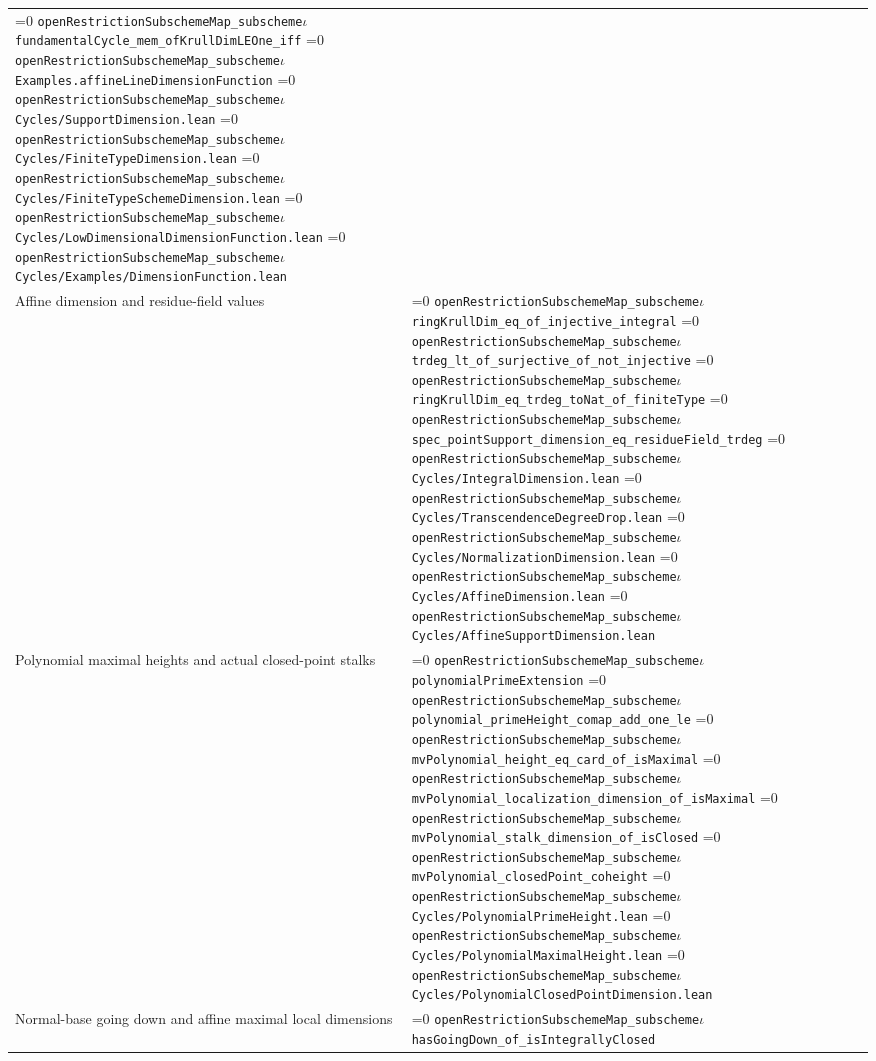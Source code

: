 \documentclass[11pt]{article}
\theoremstyle{definition}
\theoremstyle{remark}
\newcommand{\leanpath}[1]{%
  \ifnum\pdfstrcmp{\detokenize{#1}}%
      {\detokenize{openRestrictionSubschemeMap_subschemeι}}=0
    \texttt{\nolinkurl{openRestrictionSubschemeMap_subscheme}}\ensuremath{\iota}%
  \else
    \texttt{\nolinkurl{#1}}%
  \fi}
\begin{document}
\begin{longtable}{@{}>{\raggedright\arraybackslash}p{}
                >{\raggedright\arraybackslash}p{}@{}}
\leanpath{fundamentalCycle_mem_ofKrullDimLEOne_iff}\newline
\leanpath{Examples.affineLineDimensionFunction}\newline
\leanpath{Cycles/SupportDimension.lean}\newline
\leanpath{Cycles/FiniteTypeDimension.lean}\newline
\leanpath{Cycles/FiniteTypeSchemeDimension.lean}\newline
\leanpath{Cycles/LowDimensionalDimensionFunction.lean}\newline
\leanpath{Cycles/Examples/DimensionFunction.lean}\\
Affine dimension and residue-field values &
\leanpath{ringKrullDim_eq_of_injective_integral}\newline
\leanpath{trdeg_lt_of_surjective_of_not_injective}\newline
\leanpath{ringKrullDim_eq_trdeg_toNat_of_finiteType}\newline
\leanpath{spec_pointSupport_dimension_eq_residueField_trdeg}\newline
\leanpath{Cycles/IntegralDimension.lean}\newline
\leanpath{Cycles/TranscendenceDegreeDrop.lean}\newline
\leanpath{Cycles/NormalizationDimension.lean}\newline
\leanpath{Cycles/AffineDimension.lean}\newline
\leanpath{Cycles/AffineSupportDimension.lean}\\
Polynomial maximal heights and actual closed-point stalks &
\leanpath{polynomialPrimeExtension}\newline
\leanpath{polynomial_primeHeight_comap_add_one_le}\newline
\leanpath{mvPolynomial_height_eq_card_of_isMaximal}\newline
\leanpath{mvPolynomial_localization_dimension_of_isMaximal}\newline
\leanpath{mvPolynomial_stalk_dimension_of_isClosed}\newline
\leanpath{mvPolynomial_closedPoint_coheight}\newline
\leanpath{Cycles/PolynomialPrimeHeight.lean}\newline
\leanpath{Cycles/PolynomialMaximalHeight.lean}\newline
\leanpath{Cycles/PolynomialClosedPointDimension.lean}\\
Normal-base going down and affine maximal local dimensions &
\leanpath{hasGoingDown_of_isIntegrallyClosed}\newline

\end{longtable}
\end{document}
